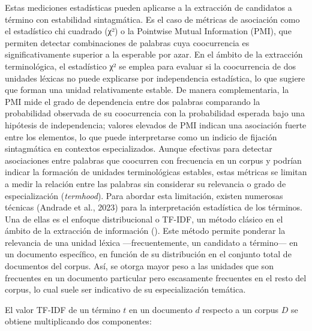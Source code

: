 Estas mediciones estadísticas pueden aplicarse a la extracción de candidatos a término con estabilidad sintagmática. Es el caso de métricas de asociación como el estadístico chi cuadrado (χ²) o la Pointwise Mutual Information (PMI), que permiten detectar combinaciones de palabras cuya coocurrencia es significativamente superior a la esperable por azar. En el ámbito de la extracción terminológica, el estadístico χ² se emplea para evaluar si la coocurrencia de dos unidades léxicas no puede explicarse por independencia estadística, lo que sugiere que forman una unidad relativamente estable. De manera complementaria, la PMI mide el grado de dependencia entre dos palabras comparando la probabilidad observada de su coocurrencia con la probabilidad esperada bajo una hipótesis de independencia; valores elevados de PMI indican una asociación fuerte entre los elementos, lo que puede interpretarse como un indicio de fijación sintagmática en contextos especializados. Aunque efectivas para detectar asociaciones entre palabras que coocurren con frecuencia en un corpus y podrían indicar la formación de unidades terminológicas estables, estas métricas se limitan a medir la relación entre las palabras sin considerar su relevancia o grado de especialización (\emph{termhood}). Para abordar esta limitación, existen numerosas técnicas (Andrade et al., 2023) para la interpretación estadística de los términos. Una de ellas es el enfoque distribucional o TF-IDF, un método clásico en el ámbito de la extracción de información (\cite{sparck1972statistical, tran2023recent}). Este método permite ponderar la relevancia de una unidad léxica —frecuentemente, un candidato a término— en un documento específico, en función de su distribución en el conjunto total de documentos del corpus. Así, se otorga mayor peso a las unidades que son frecuentes en un documento particular pero escasamente frecuentes en el resto del corpus, lo cual suele ser indicativo de su especialización temática.



El valor TF-IDF de un término $t$ en un documento $d$ respecto a un corpus $D$ se obtiene multiplicando dos componentes:


